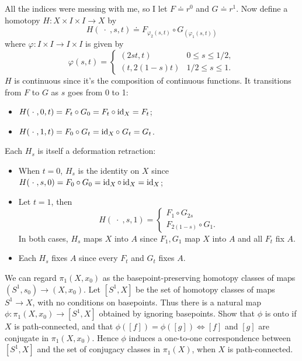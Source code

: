 \documentclass[twoside,10pt]{article}
\begin{document}
All the indices were messing with me, so I let $F \doteq r^{0}$ and $G \doteq r^{1}$. Now define a homotopy $H:X\times I\times I \to X$ by
\[
	H(\;\cdot\;,s,t) \doteq F_{\varphi_2(s,t)} \circ G_{(\varphi_1(s,t))}
\] 
where $\varphi:I\times I\to I\times I$ is given by
\[
	\varphi(s,t) =
	\begin{cases}
		(2st, t) & 0\leq s \leq 1/2, \\
		(t,2(1-s)t) & 1/2 \leq s \leq 1.
	\end{cases}
\] 
$H$ is continuous since it's the composition of continuous functions. It transitions from $F$ to $G$ as $s$ goes from 0 to 1:
\begin{itemize}
	\item $H(\;\cdot\;,0,t) = F_{t}\circ G_0 = F_{t}\circ \operatorname{id}_{X}=F_{t}$;
	\item $H(\;\cdot\;,1,t) = F_{0}\circ G_{t} = \operatorname{id}_{X}\circ \;G_{t}=G_{t}$.
\end{itemize}
Each $H_{s}$ is itself a deformation retraction:
\begin{itemize}
	\item When $t=0$, $H_{s}$ is the identity on $X$ since $H(\;\cdot\;,s,0) = F_{0}\circ G_{0}= \operatorname{id}_{X}\circ \operatorname{id}_{X}=\operatorname{id}_{X}$;
	\item Let $t=1$, then \[
			H(\;\cdot\;,s,1) =
			\begin{cases}
				F_{1} \circ G_{2s} \\
				F_{2(1-s)}\circ G_{1}.
			\end{cases}
		\] In both cases, $H_{s}$ maps $X$ into $A$ since $F_{1}, G_{1}$ map $X$ into $A$ and all $F_{t}$ fix $A$.
	\item Each $H_{s}$ fixes $A$ since every $F_{t}$ and $G_{t}$ fixes $A$.
\end{itemize}

\newpage

\begin{exer}[1.1: 6]
	We can regard $\pi_1(X,x_0)$ as the basepoint-preserving homotopy classes of maps $(S^{1},s_0)\to (X,x_0)$. Let $[S^{1},X]$ be the set of homotopy classes of maps $S^{1}\to X$, with no conditions on basepoints. Thus there is a natural map $\phi:\pi_1(X,x_0)\to [S^{1},X]$ obtained by ignoring basepoints. Show that $\phi$ is onto if $X$ is path-connected, and that $\phi([f]) = \phi([g]) \iff [f]$ and $[g]$ are conjugate in $\pi_1(X,x_0)$. Hence $\phi$ induces a one-to-one correspondence between $[S^{1},X]$ and the set of conjugacy classes in $\pi_1(X)$, when $X$ is path-connected.
\end{exer}
\end{document}
